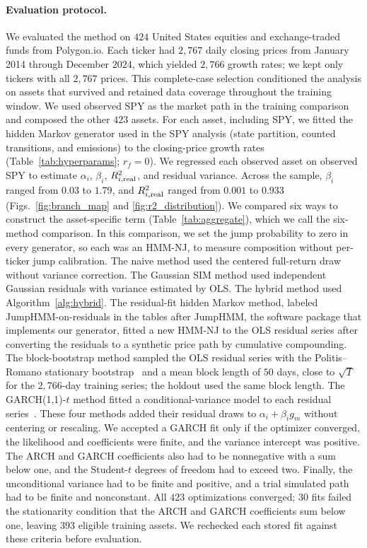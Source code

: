 \paragraph{Evaluation protocol.}

We evaluated the method on $424$ United States equities and exchange-traded funds
from Polygon.io. Each ticker had $2{,}767$ daily closing prices from
January 2014 through December $2024$, which yielded $2{,}766$ growth rates; we kept only tickers with all
$2{,}767$ prices. This complete-case selection conditioned the analysis on assets
that survived and retained data coverage throughout the training
window. We used observed SPY as the market path in the training
comparison and composed the other $423$ assets. For each asset, including SPY, we fitted the hidden Markov generator used in the SPY analysis
(state partition, counted transitions, and emissions) to the
closing-price growth rates
(Table~\ref{tab:hyperparams}; $r_f=0$). We regressed each observed
asset on observed SPY to estimate $\alpha_i$, $\beta_i$,
$R^2_{i,\mathrm{real}}$, and residual variance. Across the sample, $\beta_i$
ranged from $0.03$ to $1.79$, and $R^2_{i,\mathrm{real}}$ ranged from $0.001$
to $0.933$ (Figs.~\ref{fig:branch_map} and \ref{fig:r2_distribution}).
We compared six ways to construct the asset-specific term
(Table~\ref{tab:aggregate}), which we call the six-method comparison.
In this comparison, we set the jump probability to zero in every
generator, so each was an HMM-NJ, to measure composition without
per-ticker jump calibration. The naive method used the centered
full-return draw without variance correction. The Gaussian SIM method
used independent Gaussian residuals with variance estimated by OLS.
The hybrid method used Algorithm~\ref{alg:hybrid}. The residual-fit
hidden Markov method, labeled JumpHMM-on-residuals in the tables after JumpHMM, the
software package that implements our generator, fitted a new HMM-NJ to the OLS residual series after converting the
residuals to a synthetic price path by cumulative compounding. The
block-bootstrap method sampled the OLS residual series with the
Politis--Romano stationary bootstrap~\cite{politisRomano1994} and a
mean block length of $50$ days, close to $\sqrt{T}$ for the
$2{,}766$-day training series; the holdout used the same block
length. The GARCH(1,1)-$t$ method
fitted a conditional-variance model to each residual
series~\cite{bollerslev1986}. These four methods added their residual
draws to $\alpha_i+\beta_i g_m$ without centering or rescaling. We accepted a GARCH fit only if the
optimizer converged, the likelihood and coefficients were finite, and
the variance intercept was positive. The ARCH and GARCH coefficients
also had to be nonnegative with a sum below one, and the Student-$t$
degrees of freedom had to exceed two. Finally, the unconditional
variance had to be finite and positive, and a trial simulated path had
to be finite and nonconstant. All $423$ optimizations converged; $30$ fits failed the stationarity
condition that the ARCH and GARCH coefficients sum below one, leaving
$393$ eligible training assets. We rechecked each stored fit against
these criteria before evaluation.

